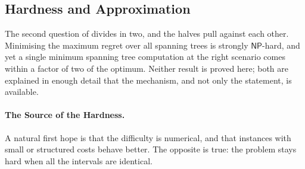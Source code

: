 %

\subsection{Hardness and Approximation}\label{sec:regret-approx-interval}

The second question of  divides in two, and the halves pull against each other.
Minimising the maximum regret over all spanning trees is strongly $\mathsf{NP}$-hard, and yet a single minimum spanning tree computation at the right scenario comes within a factor of two of the optimum.
Neither result is proved here; both are explained in enough detail that the mechanism, and not only the statement, is available.

\paragraph{The Source of the Hardness.}

A natural first hope is that the difficulty is numerical, and that instances with small or structured costs behave better.
The opposite is true: the problem stays hard when all the intervals are identical.

